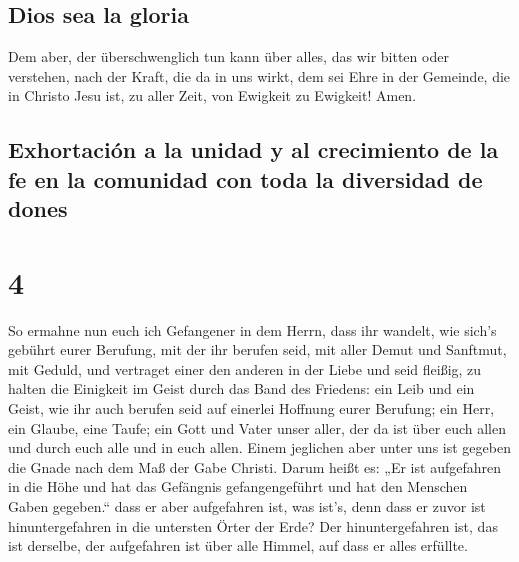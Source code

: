 \hypertarget{dios-sea-la-gloria}{%
\subsection{Dios sea la gloria}\label{dios-sea-la-gloria}}

 Dem aber, der überschwenglich tun kann über alles, das
wir bitten oder verstehen, nach der Kraft, die da in uns wirkt,
 dem sei Ehre in der Gemeinde, die in Christo Jesu ist,
zu aller Zeit, von Ewigkeit zu Ewigkeit! Amen.

\hypertarget{exhortaciuxf3n-a-la-unidad-y-al-crecimiento-de-la-fe-en-la-comunidad-con-toda-la-diversidad-de-dones}{%
\subsection{Exhortación a la unidad y al crecimiento de la fe en la
comunidad con toda la diversidad de
dones}\label{exhortaciuxf3n-a-la-unidad-y-al-crecimiento-de-la-fe-en-la-comunidad-con-toda-la-diversidad-de-dones}}

\hypertarget{section-3}{%
\section{4}\label{section-3}}

 So ermahne nun euch ich Gefangener in dem Herrn, dass ihr
wandelt, wie sich's gebührt eurer Berufung, mit der ihr berufen seid,
 mit aller Demut und Sanftmut, mit Geduld, und vertraget
einer den anderen in der Liebe  und seid fleißig, zu
halten die Einigkeit im Geist durch das Band des Friedens:
 ein Leib und ein Geist, wie ihr auch berufen seid auf
einerlei Hoffnung eurer Berufung;  ein Herr, ein Glaube,
eine Taufe;  ein Gott und Vater unser aller, der da ist
über euch allen und durch euch alle und in euch allen. 
Einem jeglichen aber unter uns ist gegeben die Gnade nach dem Maß der
Gabe Christi.  Darum heißt es: „Er ist aufgefahren in die
Höhe und hat das Gefängnis gefangengeführt und hat den Menschen Gaben
gegeben.``  dass er aber aufgefahren ist, was ist's, denn
dass er zuvor ist hinuntergefahren in die untersten Örter der Erde?
 Der hinuntergefahren ist, das ist derselbe, der
aufgefahren ist über alle Himmel, auf dass er alles erfüllte.

